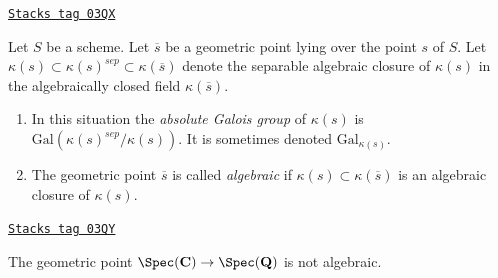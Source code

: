 \begin{definition}
\label{etale-cohomology-definition-algebraic-geometric-point}
\href{https://stacks.math.columbia.edu/tag/03QX}{\texttt{Stacks tag 03QX}}

Let $S$ be a scheme.
Let $\overline{s}$ be a geometric point lying over the point $s$ of $S$.
Let $\kappa(s) \subset \kappa(s)^{sep} \subset \kappa(\overline{s})$
denote the separable algebraic closure of $\kappa(s)$ in the algebraically
closed field $\kappa(\overline{s})$.
\begin{enumerate}
\item In this situation the {\it absolute Galois group} of $\kappa(s)$
is $\text{Gal}(\kappa(s)^{sep}/\kappa(s))$. It is sometimes denoted
$\text{Gal}_{\kappa(s)}$.
\item The geometric point $\overline{s}$ is called
{\it algebraic} if $\kappa(s) \subset \kappa(\overline{s})$ is
an algebraic closure of $\kappa(s)$.
\end{enumerate}
\end{definition}

\begin{example}[Stupid]
\label{etale-cohomology-example-stupid}
\href{https://stacks.math.columbia.edu/tag/03QY}{\texttt{Stacks tag 03QY}}

The geometric point
$\Spec(\mathbf{C}) \to \Spec(\mathbf{Q})$
is not algebraic.
\end{example}

